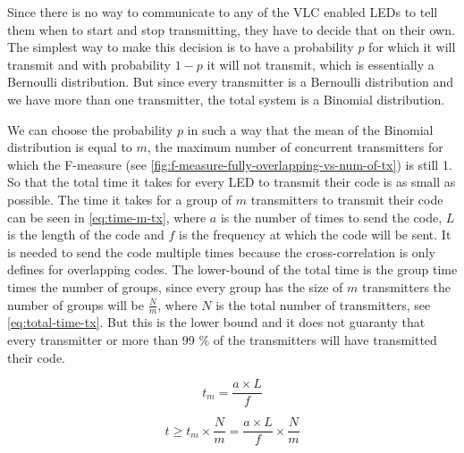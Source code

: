 		Since there is no way to communicate to any of the VLC enabled LEDs to tell them when to start and stop transmitting, they have to decide that on their own. 
		The simplest way to make this decision is to have a probability $p$ for which it will transmit and with probability $1 - p$ it will not transmit, which is essentially a Bernoulli distribution.
		But since every transmitter is a Bernoulli distribution and we have more than one transmitter, the total system is a Binomial distribution.

		We can choose the probability $p$ in such a way that the mean of the Binomial distribution is equal to $m$, the maximum number of concurrent transmitters for which the F-measure (see \autoref{fig:f-measure-fully-overlapping-vs-num-of-tx}) is still 1.
		So that the total time it takes for every LED to transmit their code is as small as possible.
		The time it takes for a group of $m$ transmitters to transmit their code can be seen in \autoref{eq:time-m-tx}, where $a$ is the number of times to send the code, $L$ is the length of the code and $f$ is the frequency at which the code will be sent. 
		It is needed to send the code multiple times because the cross-correlation is only defines for overlapping codes.
		The lower-bound of the total time is the group time times the number of groups, since every group has the size of $m$ transmitters the number of groups will be $\frac{N}{m}$, where $N$ is the total number of transmitters, see \autoref{eq:total-time-tx}.
		But this is the lower bound and it does not guaranty that every transmitter or more than 99 \% of the transmitters will have transmitted their code.
 
		\begin{equation}
			\label{eq:time-m-tx}
			t_{m} = \frac{a \times L}{f}
		\end{equation}

		\begin{equation}
			\label{eq:total-time-tx}
			t \ge t_{m} \times \frac{N}{m} = \frac{a \times L}{f} \times \frac{N}{m}
		\end{equation}

